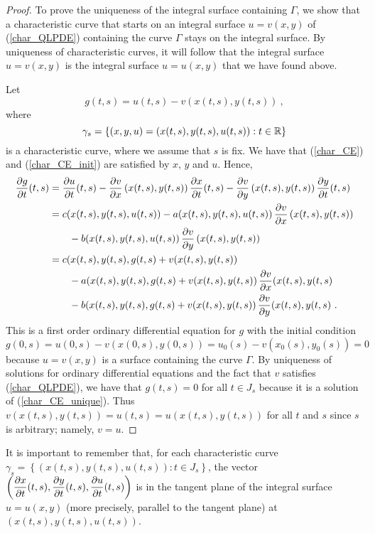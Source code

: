 \begin{proof}
 To prove the uniqueness of the integral surface containing
$\Gamma$, we show that a characteristic curve that starts on an
integral surface $u=v(x,y)$ of (\ref{char_QLPDE}) containing the curve
$\Gamma$ stays on the integral surface.  By uniqueness of
characteristic curves, it will follow that the integral surface
$u=v(x,y)$ is the integral surface $u=u(x,y)$ that we have found
above.

Let
\[
g(t,s) = u(t,s) - v(x(t,s),y(t,s)) \ ,
\]
where
\[
\gamma_s = \left\{ (x,y,u) = (x(t,s), y(t,s) ,u(t,s)) : t \in \mathbb{R} \right\}
\]
is a characteristic curve, where we assume that $s$ is fix.
We have that (\ref{char_CE}) and (\ref{char_CE_init}) are satisfied
by $x$, $y$ and $u$.  Hence,
\begin{align}
\frac{\partial{g}}{\partial t}(t,s) &= 
\frac{\partial{u}}{\partial t}(t,s) - \frac{\partial{v}}{\partial x}\left(x(t,s),y(t,s)\right) \frac{\partial{x}}{\partial t}(t,s)
- \frac{\partial{v}}{\partial y}\left(x(t,s),y(t,s)\right) \frac{\partial{y}}{\partial t}(t,s) \nonumber \\
&= c(x(t,s),y(t,s),u(t,s)) - a(x(t,s),y(t,s),u(t,s))\,
\frac{\partial{v}}{\partial x}\left(x(t,s),y(t,s)\right) \nonumber \\
&\qquad - b(x(t,s),y(t,s),u(t,s))\,\frac{\partial{v}}{\partial y}\left(x(t,s),y(t,s)\right)
\nonumber \\
&= c(x(t,s),y(t,s),g(t,s)+v(x(t,s),y(t,s)) \nonumber \\
&\qquad - a(x(t,s),y(t,s),g(t,s)+v(x(t,s),y(t,s))\,
\frac{\partial{v}}{\partial x}(x(t,s),y(t,s) \nonumber \\
&\qquad -  b(x(t,s),y(t,s),g(t,s)+v(x(t,s),y(t,s))\,\frac{\partial{v}}{\partial y}(x(t,s),y(t,s)
\label{char_CE_unique} \ .
\end{align}
This is a first order ordinary differential equation for $g$ with the
initial condition
\[
g(0,s) = u(0,s) - v(x(0,s),y(0,s)) = u_0(s) - v(x_0(s),y_0(s)) = 0
\]
because $u=v(x,y)$ is a surface containing the curve $\Gamma$.
By uniqueness of solutions for ordinary differential equations and the
fact that $v$ satisfies (\ref{char_QLPDE}), we have that $g(t,s) = 0$
for all $t \in J_s$ because it is a solution of (\ref{char_CE_unique}). Thus
$v(x(t,s),y(t,s)) = u(t,s) = u(x(t,s),y(t,s))$ for all $t$ and $s$
since $s$ is arbitrary; namely, $v = u$.
\end{proof}

\begin{rmk}
It is important to remember that, for each characteristic curve\\
$\displaystyle
\gamma_s =  \left\{ \left(x(t,s),y(t,s),u(t,s)\right) : t \in J_s\right\}$,
the vector
$\displaystyle
\left(\frac{\partial{x}}{\partial t}(t,s), \frac{\partial{y}}{\partial t}(t,s), \frac{\partial{u}}{\partial t}(t,s)\right) $
is in the tangent plane of the integral surface $u=u(x,y)$ (more
precisely, parallel to the tangent plane) at
$\left(x(t,s),y(t,s),u(t,s)\right)$.
\end{rmk}

